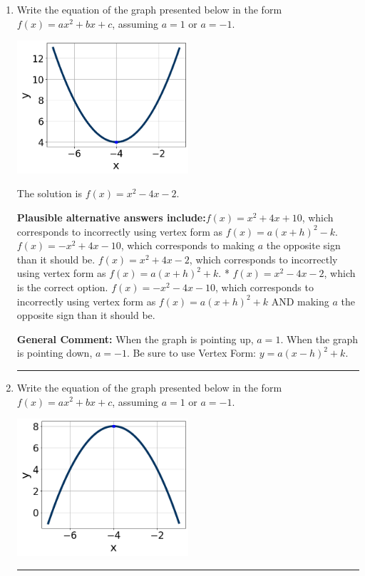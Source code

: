 \documentclass{extbook}[14pt]
\newcommand{\litem}[1]{\item #1

\rule{\textwidth}{0.4pt}}
\begin{document}
\begin{enumerate}\litem{
Write the equation of the graph presented below in the form $f(x)=ax^2+bx+c$, assuming  $a=1$ or $a=-1$.

\begin{center}
    \includegraphics[width=0.5\textwidth]{../Figures/quadraticGraphToEquationCopyC.png}
\end{center}


The solution is \( f(x) = x^{2} -4 x -2 \).\begin{enumerate}[label=\Alph*.]
\textbf{Plausible alternative answers include:}$f(x)=x^{2} +4 x + 10$, which corresponds to incorrectly using vertex form as $f(x) = a(x+h)^2 - k$.
$f(x)=-x^{2} +4 x -10$, which corresponds to making $a$ the opposite sign than it should be.
$f(x)=x^{2} +4 x -2$, which corresponds to incorrectly using vertex form as $f(x) = a(x+h)^2+k$.
* $f(x)=x^{2} -4 x -2$, which is the correct option.
$f(x)=-x^{2} -4 x -10$, which corresponds to incorrectly using vertex form as $f(x) = a(x+h)^2+k$ AND making $a$ the opposite sign than it should be.
\end{enumerate}

\textbf{General Comment:} When the graph is pointing up, $a=1$. When the graph is pointing down, $a=-1$. Be sure to use Vertex Form: $y = a(x-h)^2+k$.
}
\litem{
Write the equation of the graph presented below in the form $f(x)=ax^2+bx+c$, assuming  $a=1$ or $a=-1$.

\begin{center}
    \includegraphics[width=0.5\textwidth]{../Figures/quadraticGraphToEquationC.png}
\end{center}


}
\end{enumerate}
\end{document}
